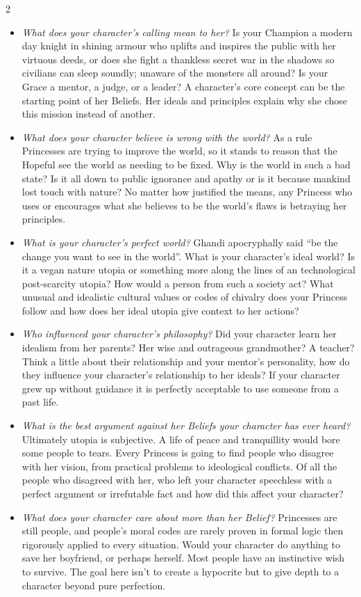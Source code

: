 \begin{multicols}{2}
\begin{itemize}
 \item \emph{What does your character's calling mean to her?} Is your Champion a modern day knight in shining armour who uplifts and inspires the public with her virtuous deeds, or does she fight a thankless secret war in the shadows so civilians can sleep soundly; unaware of the monsters all around? Is your Grace a mentor, a judge, or a leader? A character's core concept can be the starting point of her Beliefs. Her ideals and principles explain why she chose this mission instead of another. 
 \item \emph{What does your character believe is wrong with the world?} As a rule Princesses are trying to improve the world, so it stands to reason that the Hopeful see the world as needing to be fixed. Why is the world in such a bad state? Is it all down to public ignorance and apathy or is it because mankind lost touch with nature? No matter how justified the means, any Princess who uses or encourages what she believes to be the world's flaws is betraying her principles. 
 \item \emph{What is your character's perfect world?} Ghandi apocryphally said \textquotedblleft be the change you want to see in the world\textquotedblright . What is your character's ideal world? Is it a vegan nature utopia or something more along the lines of an technological post-scarcity utopia? How would a person from such a society act? What unusual and idealistic cultural values or codes of chivalry does your Princess follow and how does her ideal utopia give context to her actions?
 \item \emph{Who influenced your character's philosophy?} Did your character learn her idealism from her parents? Her wise and outrageous grandmother? A teacher? Think a little about their relationship and your mentor's personality, how do they influence your character's relationship to her ideals? If your character grew up without guidance it is perfectly acceptable to use someone from a past life. 
 \item \emph{What is the best argument against her Beliefs your character has ever heard?} Ultimately utopia is subjective. A life of peace and tranquillity would bore some people to tears. Every Princess is going to find people who disagree with her vision, from practical problems to ideological conflicts. Of all the people who disagreed with her, who left your character speechless with a perfect argument or irrefutable fact and how did this affect your character?
 \item \emph{What does your character care about more than her Belief?} Princesses are still people, and people's moral codes are rarely proven in formal logic then rigorously applied to every situation. Would your character do anything to save her boyfriend, or perhaps herself. Most people have an instinctive wish to survive. The goal here isn't to create a hypocrite but to give depth to a character beyond pure perfection. 
\end{itemize}


\end{multicols}

